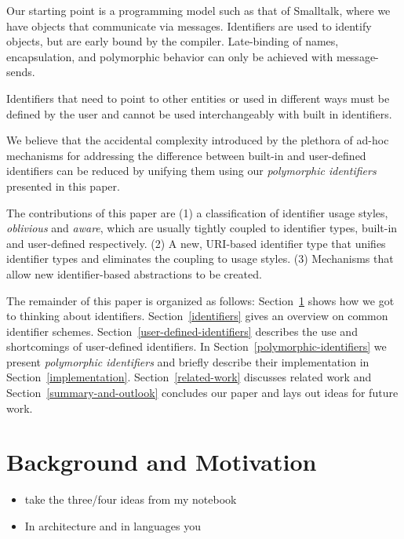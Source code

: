 \documentclass[preprint,authoryear]{acm_proc_article-sp}
\begin{document}
Our starting point is a programming model such as that of Smalltalk, where we have objects
that communicate via messages\cite{Goldberg1983}.   Identifiers are used to identify 
objects, but are early bound by the compiler.  Late-binding of names, encapsulation,
and polymorphic behavior can only be achieved with message-sends.


Identifiers that need to point to other entities or used in different ways must be defined
by the user and cannot be used interchangeably with built in identifiers.  

We believe that the accidental complexity introduced by the
plethora of ad-hoc mechanisms for addressing the difference between built-in 
and user-defined identifiers can be reduced 
by unifying them using our \emph{polymorphic identifiers} presented in this paper.

The contributions of this paper are (1) a classification of identifier usage styles, {\em oblivious}
and {\em aware}, which
are usually tightly coupled to identifier types, built-in and user-defined respectively.
(2) A new, URI-based identifier type
that unifies identifier types and eliminates the coupling to usage styles. (3) Mechanisms
that allow new identifier-based abstractions to be created.


The remainder of this paper is organized as follows: 
Section~\ref{background}  shows how we got to thinking about identifiers.
Section~\ref{identifiers} gives an overview on common identifier schemes.
Section~\ref{user-defined-identifiers} describes the use and shortcomings of user-defined identifiers.
In Section~\ref{polymorphic-identifiers} we present \emph{polymorphic identifiers} and briefly describe their implementation in Section~\ref{implementation}.
Section~\ref{related-work} discusses related work and Section~\ref{summary-and-outlook} concludes our paper and lays out ideas for future work.




\section{Background and Motivation}
\label{background}

\begin{itemize}
\item take the three/four ideas from my notebook
\item In architecture and in languages you
\end{itemize} 
\end{document}
